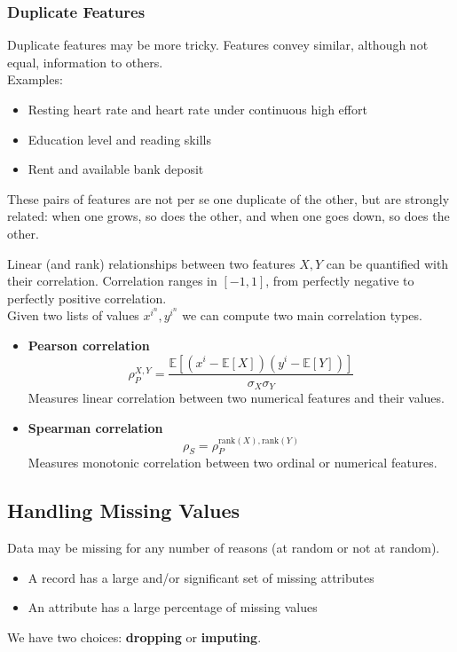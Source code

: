 \subsubsection{Duplicate Features}
Duplicate features may be more tricky. Features convey similar, although not equal, information to others.\\
Examples:
\begin{itemize}
	\item Resting heart rate and heart rate under
continuous high effort
	\item Education level and reading skills
	\item Rent and available bank deposit
\end{itemize}
These pairs of features are not per se one duplicate
of the other, but are strongly related: when one
grows, so does the other, and when one goes down,
so does the other.
\nl

Linear (and rank) relationships between two features $X,Y$ can be quantified with their
correlation. Correlation ranges in \([-1, 1]\), from perfectly negative to perfectly positive
correlation.\\
Given two lists of values $x^{i^n},y^{i^n}$ we can compute two main correlation types.
\begin{itemize}
   \item \textbf{Pearson correlation}
         \[
            \rho_P^{X,Y} = \frac{\mathbb{E}\left[(x^i - \mathbb{E}[X])(y^i - \mathbb{E}[Y])\right]}{\sigma_X \sigma_Y}
         \]
         Measures linear correlation between two numerical features and their values.
   \item \textbf{Spearman correlation}
         \[
            \rho_S = \rho_P^{\text{rank}(X), \text{rank}(Y)}
         \]
         Measures monotonic correlation between two ordinal or numerical features.
\end{itemize}

\subsection{Handling Missing Values}
Data may be missing for any number of reasons (at random or not at random).
\begin{itemize}
	\item A record has a large and/or significant set of missing attributes
	\item An attribute has a large percentage of missing values
\end{itemize}
We have two choices: \textbf{dropping} or \textbf{imputing}.


